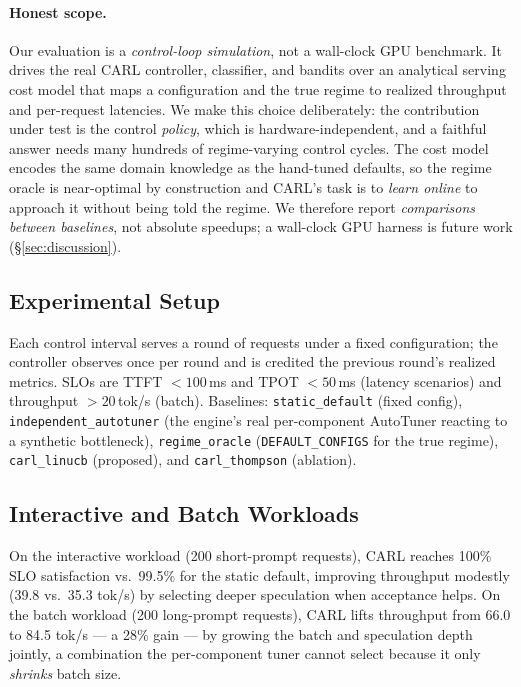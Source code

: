 \documentclass[10pt,twocolumn]{article}
\begin{document}
\paragraph{Honest scope.} Our evaluation is a \emph{control-loop simulation}, not
a wall-clock GPU benchmark. It drives the real CARL controller, classifier, and
bandits over an analytical serving cost model that maps a configuration and the
true regime to realized throughput and per-request latencies. We make this
choice deliberately: the contribution under test is the control \emph{policy},
which is hardware-independent, and a faithful answer needs many hundreds of
regime-varying control cycles. The cost model encodes the same domain knowledge
as the hand-tuned defaults, so the regime oracle is near-optimal by construction
and CARL's task is to \emph{learn online} to approach it without being told the
regime. We therefore report \emph{comparisons between baselines}, not absolute
speedups; a wall-clock GPU harness is future work (\S\ref{sec:discussion}).

\subsection{Experimental Setup}
\label{sec:setup}

Each control interval serves a round of requests under a fixed configuration;
the controller observes once per round and is credited the previous round's
realized metrics. SLOs are TTFT $<100$\,ms and TPOT $<50$\,ms (latency
scenarios) and throughput $>20$\,tok/s (batch). Baselines: \texttt{static\_default}
(fixed config), \texttt{independent\_autotuner} (the engine's real per-component
AutoTuner reacting to a synthetic bottleneck), \texttt{regime\_oracle}
(\texttt{DEFAULT\_CONFIGS} for the true regime), \texttt{carl\_linucb}
(proposed), and \texttt{carl\_thompson} (ablation).

\subsection{Interactive and Batch Workloads}
\label{sec:eval12}

On the interactive workload (200 short-prompt requests), CARL reaches 100\% SLO
satisfaction vs.\ 99.5\% for the static default, improving throughput modestly
(39.8 vs.\ 35.3 tok/s) by selecting deeper speculation when acceptance helps. On
the batch workload (200 long-prompt requests), CARL lifts throughput from 66.0
to 84.5 tok/s --- a 28\% gain --- by growing the batch and speculation depth
jointly, a combination the per-component tuner cannot select because it only
\emph{shrinks} batch size.
\end{document}
